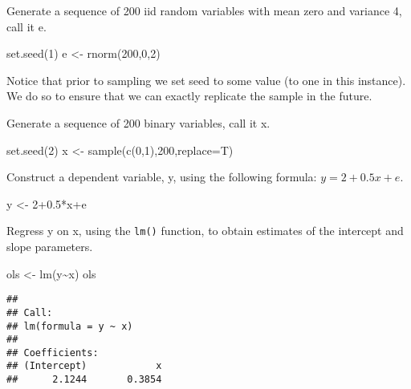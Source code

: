 \documentclass[
  oneside]{book}
\newenvironment{Shaded}{\begin{snugshade}}{\end{snugshade}}
\newcommand{\AttributeTok}[1]{\textcolor[rgb]{0.77,0.63,0.00}{#1}}
\newcommand{\DecValTok}[1]{\textcolor[rgb]{0.00,0.00,0.81}{#1}}
\newcommand{\FloatTok}[1]{\textcolor[rgb]{0.00,0.00,0.81}{#1}}
\newcommand{\FunctionTok}[1]{\textcolor[rgb]{0.00,0.00,0.00}{#1}}
\newcommand{\NormalTok}[1]{#1}
\newcommand{\OtherTok}[1]{\textcolor[rgb]{0.56,0.35,0.01}{#1}}
\newcommand{\SpecialCharTok}[1]{\textcolor[rgb]{0.00,0.00,0.00}{#1}}
\begin{document}
Generate a sequence of 200 iid random variables with mean zero and variance 4, call it e.

\begin{Shaded}
\begin{Highlighting}[]
\FunctionTok{set.seed}\NormalTok{(}\DecValTok{1}\NormalTok{)}
\NormalTok{e }\OtherTok{\textless{}{-}} \FunctionTok{rnorm}\NormalTok{(}\DecValTok{200}\NormalTok{,}\DecValTok{0}\NormalTok{,}\DecValTok{2}\NormalTok{)}
\end{Highlighting}
\end{Shaded}

Notice that prior to sampling we set seed to some value (to one in this instance). We do so to ensure that we can exactly replicate the sample in the future.

Generate a sequence of 200 binary variables, call it x.

\begin{Shaded}
\begin{Highlighting}[]
\FunctionTok{set.seed}\NormalTok{(}\DecValTok{2}\NormalTok{)}
\NormalTok{x }\OtherTok{\textless{}{-}} \FunctionTok{sample}\NormalTok{(}\FunctionTok{c}\NormalTok{(}\DecValTok{0}\NormalTok{,}\DecValTok{1}\NormalTok{),}\DecValTok{200}\NormalTok{,}\AttributeTok{replace=}\NormalTok{T)}
\end{Highlighting}
\end{Shaded}

Construct a dependent variable, y, using the following formula: \(y=2+0.5x+e\).

\begin{Shaded}
\begin{Highlighting}[]
\NormalTok{y }\OtherTok{\textless{}{-}} \DecValTok{2}\FloatTok{+0.5}\SpecialCharTok{*}\NormalTok{x}\SpecialCharTok{+}\NormalTok{e}
\end{Highlighting}
\end{Shaded}

Regress y on x, using the \texttt{lm()} function, to obtain estimates of the intercept and slope parameters.

\begin{Shaded}
\begin{Highlighting}[]
\NormalTok{ols }\OtherTok{\textless{}{-}} \FunctionTok{lm}\NormalTok{(y}\SpecialCharTok{\textasciitilde{}}\NormalTok{x)}
\NormalTok{ols}
\end{Highlighting}
\end{Shaded}

\begin{verbatim}
## 
## Call:
## lm(formula = y ~ x)
## 
## Coefficients:
## (Intercept)            x  
##      2.1244       0.3854
\end{verbatim}
\end{document}
